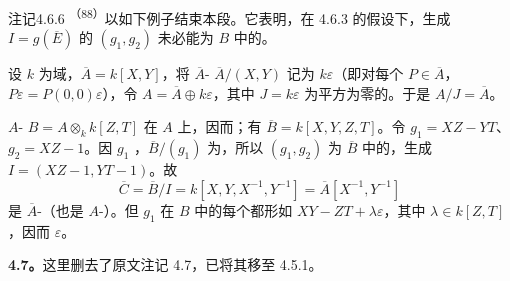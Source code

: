\begin{SGAresult}{注记}{4.6.6}
\textsuperscript{（88）}以如下例子结束本段。它表明，在 4.6.3 的假设下，生成 $I=g(\overline E)$ 的 $(g_1,g_2)$ 未必能为 $B$ 中的。

设 $k$ 为域，$\overline A=k[X,Y]$，将 $\overline A$- $\overline A/(X,Y)$ 记为 $k\varepsilon$（即对每个 $P\in\overline A$，$P\varepsilon=P(0,0)\varepsilon$），令 $A=\overline A\oplus k\varepsilon$，其中 $J=k\varepsilon$ 为平方为零的。于是 $A/J=\overline A$。

$A$- $B=A\otimes_k k[Z,T]$ 在 $A$ 上，因而；有 $\overline B=k[X,Y,Z,T]$。令 $g_1=XZ-YT$、$g_2=XZ-1$。因 $g_1$ ，$\overline B/(g_1)$ 为，所以 $(g_1,g_2)$ 为 $\overline B$ 中的，生成 $I=(XZ-1,YT-1)$。故
\[\overline C=\overline B/I=k[X,Y,X^{-1},Y^{-1}]=\overline A[X^{-1},Y^{-1}]\]
是 $\overline A$-（也是 $A$-）。但 $g_1$ 在 $B$ 中的每个都形如 $XY-ZT+\lambda\varepsilon$，其中 $\lambda\in k[Z,T]$，因而 $\varepsilon$。
\end{SGAresult}
\textbf{4.7。}这里删去了原文注记 4.7，已将其移至 4.5.1。
